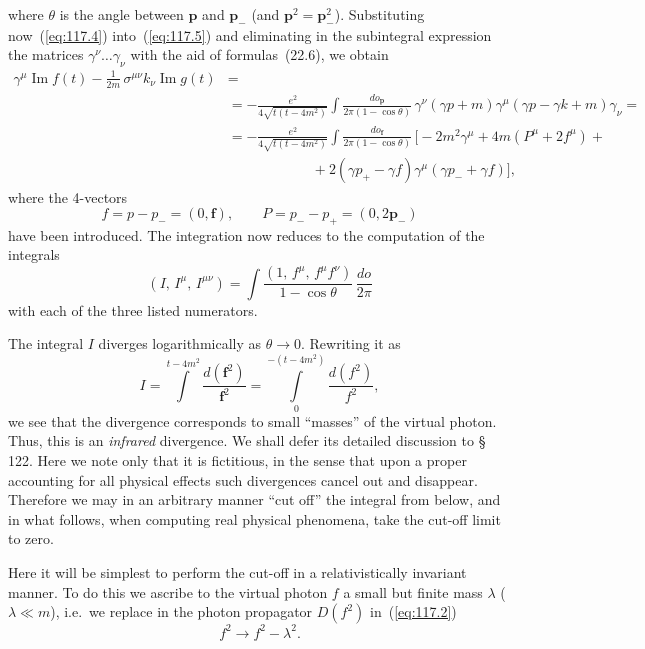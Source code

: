 \noindent where $\theta$ is the angle between $\mathbf{p}$ and $\mathbf{p}_-$ (and $\mathbf{p}^2 = \mathbf{p}_-^2$). Substituting now~(\ref{eq:117.4}) into~(\ref{eq:117.5}) and eliminating in the subintegral expression the matrices $\gamma^\nu \ldots \gamma_\nu$ with the aid of formulas~(22.6), we obtain
\begin{equation}
\begin{split}
\gamma^\mu \operatorname{Im} f(t) - \frac{1}{2m}\,\sigma^{\mu\nu} k_\nu\operatorname{Im} g(t) &= {} \\
&= -\frac{e^2}{4\sqrt{t(t - 4m^2)}}\int \frac{d o_{\mathbf{p}}}{2\pi(1 - \cos\theta)}\,\gamma^\nu(\gamma p + m)\gamma^\mu(\gamma p - \gamma k + m)\gamma_\nu = {} \\
&= -\frac{e^2}{4\sqrt{t(t - 4m^2)}}\int \frac{d o_{\mathbf{f}}}{2\pi(1 - \cos\theta)}\,\bigl[-2m^2\gamma^\mu + 4m(P^\mu + 2f^\mu) + {} \\
& \qquad\qquad\qquad + 2(\gamma p_+ - \gamma f)\gamma^\mu(\gamma p_- + \gamma f)\bigr],
\end{split}
\label{eq:117.7}
\end{equation}
where the 4-vectors
\begin{equation}
f = p - p_- = (0, \mathbf{f}), \qquad P = p_- - p_+ = (0, 2\mathbf{p}_-)
\label{eq:117.8}
\end{equation}
have been introduced. The integration now reduces to the computation of the integrals
\begin{equation}
(I,\, I^\mu,\, I^{\mu\nu}) = \int \frac{(1,\, f^\mu,\, f^\mu f^\nu)}{1 - \cos\theta}\,\frac{d o}{2\pi}
\label{eq:117.9}
\end{equation}
with each of the three listed numerators.

The integral $I$ diverges logarithmically as $\theta \to 0$. Rewriting it as
\[
I = \int\limits^{t - 4m^2} \frac{d(\mathbf{f}^2)}{\mathbf{f}^2} = \int\limits_0^{-(t - 4m^2)} \frac{d(f^2)}{f^2},
\]
we see that the divergence corresponds to small ``masses'' of the virtual photon. Thus, this is an \emph{infrared} divergence. We shall defer its detailed discussion to \S\,122. Here we note only that it is fictitious, in the sense that upon a proper accounting for all physical effects such divergences cancel out and disappear.  Therefore we may in an arbitrary manner ``cut off'' the integral from below, and in what follows, when computing real physical phenomena, take the cut-off limit to zero.

Here it will be simplest to perform the cut-off in a relativistically invariant manner. To do this we ascribe to the virtual photon $f$ a small but finite mass $\lambda$ ($\lambda \ll m$), i.e.\ we replace in the photon propagator $D(f^2)$ in~(\ref{eq:117.2})
\begin{equation}
f^2 \to f^2 - \lambda^2.
\label{eq:117.10}
\end{equation}

